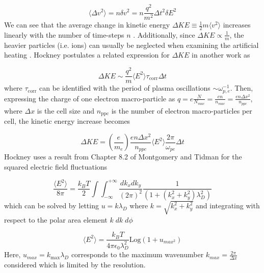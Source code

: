 \begin{equation}
	\langle \Delta v^2 \rangle = n \delta v ^2 = n \frac{q^2}{m^2} \Delta t^2 \delta E^2
\end{equation}
We can see that the average change in kinetic energy $\Delta KE \equiv \frac{1}{2} m \langle v^2 \rangle$ increases linearly with the number of time-steps $n$ \cite{Hockney_1988_PIC}. Additionally, since $\Delta KE \propto \frac{1}{m}$, the heavier particles (i.e. ions) can usually be neglected when examining the artificial heating \cite{Hockney_1988_PIC}. Hockney postulates a related expression \cite{Hockney_1971_JoCP} for $\Delta KE$ in another work as 

\begin{equation}
	\Delta KE \sim \frac{q^2}{m} \langle E^2 \rangle \tau_\text{corr} \Delta t
\end{equation}
where $\tau_\text{corr}$ can be identified with the period of plasma oscillations $\sim \omega_{p,e}^{-1}$. Then, expressing the charge of one electron macro-particle as $q = e \frac{N}{N_{mac}} = \frac{e n}{n_{mac}} = \frac{e n \Delta x^2}{n_{ppc}}$, where $\Delta x$ is the cell size and $n_\text{ppc}$ is the number of electron macro-particles per cell, the kinetic energy increase becomes

\begin{equation}
	\Delta KE = (\frac{e}{m_e}) \frac{e n \Delta x^2}{n_{ppc}} \langle E^2 \rangle \frac{2 \pi}{\omega_{pe}} \Delta t 
\end{equation}
Hockney uses a result from Chapter 8.2 of Montgomery and Tidman \cite{Montgomery_1964_Plasma} for the squared electric field fluctuations

\begin{equation} 
	\frac{\langle E^2 \rangle}{8 \pi} = \frac{k_B T}{2} \int \int_{-\infty}^{+\infty} \frac{d k_x d k_y}{(2 \pi)^2} \frac{1}{(1 + (k_x^2 + k_y^2) \lambda_D^2)} 
\end{equation}
which can be solved by letting $u = k \lambda_D$ where $k = \sqrt{k_x^2 + k_y^2}$ and integrating with respect to the polar area element $k \; dk \; d \phi$

\begin{equation}
	\langle E^2 \rangle = \frac{k_B T}{4 \pi \epsilon_0 \lambda_D^2} \text{Log}(1 + u_{max^2}) \label{eq:e2}
\end{equation}
Here, $u_{max} = k_\text{max} \lambda_D$ corresponds to the maximum wavenumber $k_{max} = \frac{2 \pi}{\Delta x}$ considered which is limited by the resolution. 

